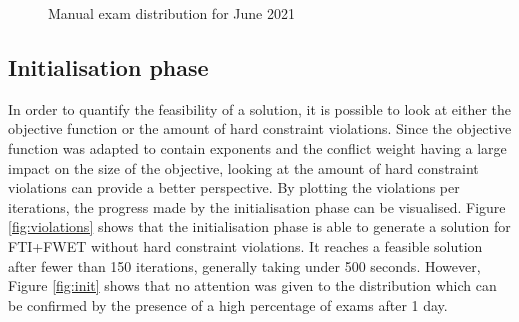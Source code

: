 \begin{figure}[h]
  \centering
  \hfill
  \caption{Manual exam distribution for June 2021}
  \label{fig:manual_sem2}
\end{figure}

\subsection{Initialisation phase}

In order to quantify the feasibility of a solution, it is possible to look at either the objective function or the amount of hard constraint violations. Since the objective function was adapted to contain exponents and the conflict weight having a large impact on the size of the objective, looking at the amount of hard constraint violations can provide a better perspective. By plotting the violations per iterations, the progress made by the initialisation phase can be visualised. Figure \ref{fig:violations} shows that the initialisation phase is able to generate a solution for FTI+FWET without hard constraint violations. It reaches a feasible solution after fewer than 150 iterations, generally taking under 500 seconds. However, Figure \ref{fig:init} shows that no attention was given to the distribution which can be confirmed by the presence of a high percentage of exams after 1 day.

